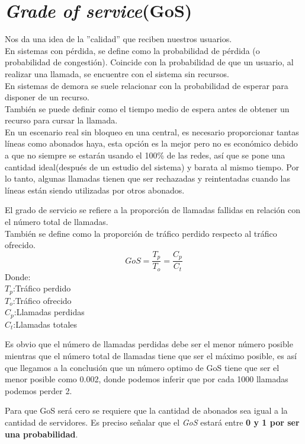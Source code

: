 \documentclass[
	12pt, %
	fleqn, %
	a4paper, %
]{LegrandOrangeBook}
\begin{document}
\section{\textit{Grade of service}(GoS)}
Nos da una idea de la ''calidad'' que reciben nuestros usuarios.\\
En sistemas con pérdida, se define como la probabilidad de pérdida (o probabilidad de congestión). Coincide con la probabilidad de que un usuario, al realizar una llamada, se encuentre con el sistema sin recursos.\\
En sistemas de demora se suele relacionar con la probabilidad de esperar para disponer de un recurso.\\
También se puede definir como el tiempo medio de espera antes de obtener un recurso para cursar la llamada.\\
En un escenario real sin bloqueo en una central, es necesario proporcionar tantas líneas como abonados haya, esta opción es la mejor pero no es económico debido a que no siempre se estarán usando el 100\% de las redes, así que se pone una cantidad ideal(después de un estudio del sistema) y barata al mismo tiempo. Por lo tanto, algunas llamadas tienen que ser rechazadas y reintentadas cuando las líneas están siendo utilizadas por otros abonados.
\begin{definition}
El grado de servicio se refiere a la proporción de llamadas fallidas en relación con el número total de llamadas.\\
También se define como la proporción de tráfico perdido respecto al tráfico ofrecido.
\begin{equation}
GoS=\frac{T_p}{T_o}=\frac{C_p}{C_t}
\end{equation}
Donde:\\$T_p$:Tráfico perdido\\$T_o$:Tráfico ofrecido\\$C_p$:Llamadas perdidas\\$C_t$:Llamadas totales
\end{definition}
\begin{remark}
Es obvio que el número de llamadas perdidas debe ser el menor número posible mientras que el número total de llamadas tiene que ser el máximo posible, es así que llegamos a la conclusión que un número optimo de GoS tiene que ser el menor posible como 0.002, donde podemos inferir que por cada 1000 llamadas podemos perder 2.
\end{remark}
\begin{remark}
Para que GoS será cero se requiere que la cantidad de abonados sea igual a la cantidad de servidores. Es preciso señalar que el \textit{GoS} estará entre \textbf{0 y 1 por ser una probabilidad}.
\end{remark}
\end{document}
